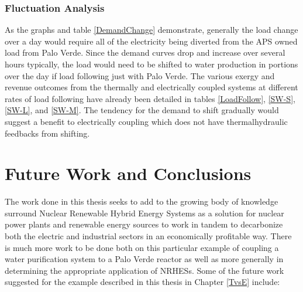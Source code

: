 \documentclass[12pt]{UIdahoMastersThesis}
\begin{document}
\subsection{Fluctuation Analysis}
As the graphs and table \ref{DemandChange} demonstrate, generally the load change over a day would require all of the electricity being diverted from the APS owned load from Palo Verde.  Since the demand curves drop and increase over several hours typically, the load would need to be shifted to water production in portions over the day if load following just with Palo Verde.  The various exergy and revenue outcomes from the thermally and electrically coupled systems at different rates of load following have already been detailed in tables \ref{LoadFollow}, \ref{SW-S}, \ref{SW-L}, and \ref{SW-M}. The tendency for the demand to shift gradually would suggest a benefit to electrically coupling which does not have thermalhydraulic feedbacks from shifting.


\chapter{Future Work and Conclusions}
\label{Chapter:FWAndConclusions}

The work done in this thesis seeks to add to the growing body of knowledge surround Nuclear Renewable Hybrid Energy Systems as a solution for nuclear power plants and renewable energy sources to work in tandem to decarbonize both the electric and industrial sectors in an economically profitable way. There is much more work to be done both on this particular example of coupling a water purification system to a Palo Verde reactor as well as more generally in determining the appropriate application of NRHESs. Some of the future work suggested for the example described in this thesis in Chapter \ref{TvsE}  include:
\end{document}
